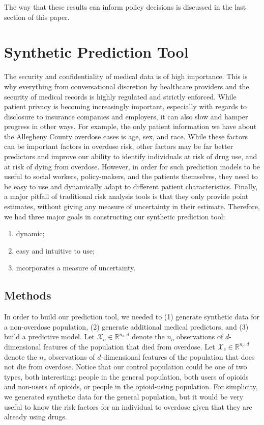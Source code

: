\documentclass{article}
\begin{document}
The way that these results can inform policy decisions is discussed in the last section of this paper.

\section{Synthetic Prediction Tool}
The security and confidentiality of medical data is of high importance. This is why everything from conversational discretion by healthcare providers and the security of medical records is highly regulated and strictly enforced. While patient privacy is becoming increasingly important, especially with regards to disclosure to insurance companies and employers, it can also slow and hamper progress in other ways. For example, the only patient information we have about the Allegheny County overdose cases is age, sex, and race. While these factors can be important factors in overdose risk, other factors may be far better predictors and improve our ability to identify individuals at risk of drug use, and at risk of dying from overdose. However, in order for such prediction models to be useful to social workers, policy-makers, and the patients themselves, they need to be easy to use and dynamically adapt to different patient characteristics. Finally, a major pitfall of traditional risk analysis tools is that they only provide point estimates, without giving any measure of uncertainty in their estimate. Therefore, we had three major goals in constructing our synthetic prediction tool:
\begin{enumerate}
\item dynamic;
\item easy and intuitive to use;
\item incorporates a measure of uncertainty.
\end{enumerate}

\subsection{Methods}
In order to build our prediction tool, we needed to (1) generate synthetic data for a non-overdose population, (2) generate additional medical predictors, and (3) build a predictive model. Let $\mathcal{X}_o \in \mathbb{R}^{n_o,d}$ denote the $n_o$ observations of $d$-dimensional features of the population that died from overdose. Let $\mathcal{X}_c \in \mathbb{R}^{n_c,d}$ denote the $n_c$ observations of $d$-dimensional features of the population that does not die from overdose. Notice that our control population could be one of two types, both interesting: people in the general population, both users of opioids and non-users of opioids, or people in the opioid-using population. For simplicity, we generated synthetic data for the general population, but it would be very useful to know the risk factors for an individual to overdose given that they are already using drugs.
\end{document}
